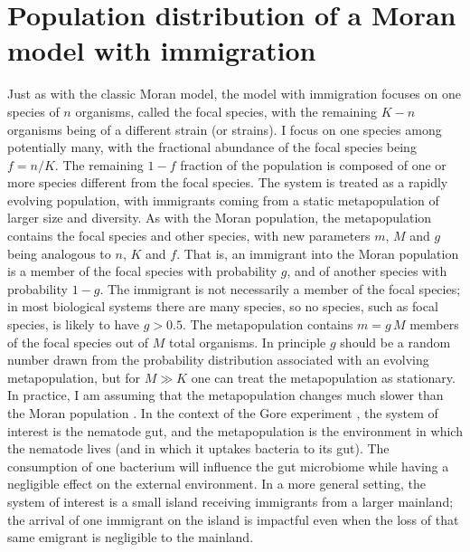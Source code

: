 \section{Population distribution of a Moran model with immigration}

Just as with the classic Moran model, the model with immigration focuses on one species of $n$ organisms, called the focal species, with the remaining $K-n$ organisms being of a different strain (or strains). 
I focus on one species among potentially many, with the fractional abundance of the focal species being $f=n/K$. 
The remaining $1-f$ fraction of the population is composed of one or more species different from the focal species. 
The system is treated as a rapidly evolving population, with immigrants coming from a static metapopulation of larger size and diversity. 
As with the Moran population, the metapopulation contains the focal species and other species, with new parameters $m$, $M$ and $g$ being analogous to $n$, $K$ and $f$. 
That is, an immigrant into the Moran population is a member of the focal species with probability $g$, and of another species with probability $1-g$. 
The immigrant is not necessarily a member of the focal species; in most biological systems there are many species, so no species, such as focal species, is likely to have $g>0.5$. 
The metapopulation contains $m = g\,M$ members of the focal species out of $M$ total organisms. 
In principle $g$ should be a random number drawn from the probability distribution associated with an evolving metapopulation, but for $M\gg K$ one can treat the metapopulation as stationary. 
In practice, I am assuming that the metapopulation changes much slower than the Moran population \cite{McKane2003}. %
In the context of the Gore experiment \cite{Vega2017}, the system of interest is the nematode gut, and the metapopulation is the environment in which the nematode lives (and in which it uptakes bacteria to its gut). 
The consumption of one bacterium will influence the gut microbiome while having a negligible effect on the external environment. 
In a more general setting, the system of interest is a small island receiving immigrants from a larger mainland; the arrival of one immigrant on the island is impactful even when the loss of that same emigrant is negligible to the mainland. 

